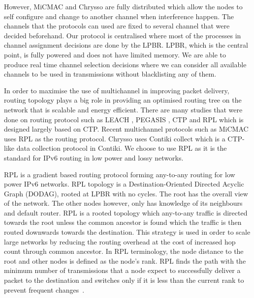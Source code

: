However, MiCMAC and Chrysso are fully distributed which allow the nodes to self configure and change to another channel when interference happen. The channels that the protocols can used are fixed to several channel that were decided beforehand. Our protocol is centralised where most of the processes in channel assignment decisions are done by the LPBR. LPBR, which is the central point, is fully powered and does not have limited memory. We are able to produce real time channel selection decisions where we can consider all available channels to be used in transmissions without blacklisting any of them.  


In order to maximise the use of multichannel in improving packet delivery, routing topology plays a big role in providing an optimised routing tree on the network that is scalable and energy efficient. There are many studies that were done on routing protocol such as LEACH \cite{leach}, PEGASIS \cite{pegasis}, CTP \cite{ctp} and RPL which is designed largely based on CTP. Recent multichannel protocols such as MiCMAC uses RPL as the routing protocol. Chrysso uses Contiki collect which is a CTP-like data collection protocol in Contiki. We choose to use RPL as it is the standard for IPv6 routing in low power and lossy networks. %

RPL is a gradient based routing protocol forming any-to-any routing for low power IPv6 networks. RPL topology is a Destination-Oriented Directed Acyclic Graph (DODAG), rooted at LPBR with no cycles. The root has the overall view of the network. The other nodes however, only has knowledge of its neighbours and default router. RPL is a rooted topology which any-to-any traffic is directed towards the root unless the common ancestor is found which the traffic is then routed downwards towards the destination. This strategy is used in order to scale large networks by reducing the routing overhead at the cost of increased hop count through common ancestor. In RPL terminology, the node distance to the root and other nodes is defined as the node's rank. RPL finds the path with the minimum number of transmissions that a node expect to successfully deliver a packet to the destination and switches only if it is less than the current rank to prevent frequent changes~\cite{mrhof}. 

